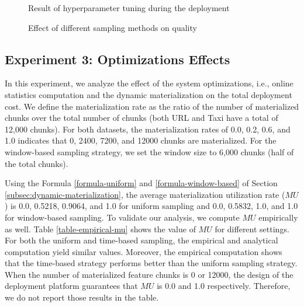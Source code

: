 \begin{figure}[!h]
\centering
\resizebox{\columnwidth}{!}{}
\caption{Result of hyperparameter tuning during the deployment}
 \vspace{-15pt}
\label{hyper-param-figure}
\end{figure}
\begin{figure}[!h]
\centering
\resizebox{\columnwidth}{!}{}
\caption{Effect of different sampling methods on quality}
 \vspace{-20pt}
\label{sampling-method-figure}
\end{figure}

\subsection{Experiment 3: Optimizations Effects}
In this experiment, we analyze the effect of the system optimizations, i.e., online statistics computation and the dynamic materialization on the total deployment cost.
We define the materialization rate as the ratio of the number of materialized chunks over the total number of chunks (both URL and Taxi have a total of 12,000 chunks).
For both datasets, the materialization rates of 0.0, 0.2, 0.6, and 1.0 indicates that 0, 2400, 7200, and 12000 chunks are materialized.
For the window-based sampling strategy, we set the window size to 6,000 chunks (half of the total chunks).

Using the Formula \ref{formula-uniform} and \ref{formula-window-based} of Section \ref{subsec:dynamic-materialization}, the average materialization utilization rate ($MU$) is 0.0, 0.5218, 0.9064, and 1.0 for uniform sampling and 0.0, 0.5832, 1.0, and 1.0 for window-based sampling.
To validate our analysis, we compute $MU$ empirically as well.
Table \ref{table-empirical-mu} shows the value of $MU$ for different settings.
For both the uniform and time-based sampling, the empirical and analytical computation yield similar values.
Moreover, the empirical computation shows that the time-based strategy performs better than the uniform sampling strategy.
When the number of materialized feature chunks is 0 or 12000, the design of the deployment platform guarantees that $MU$ is 0.0 and 1.0 respectively. 
Therefore, we do not report those results in the table.

